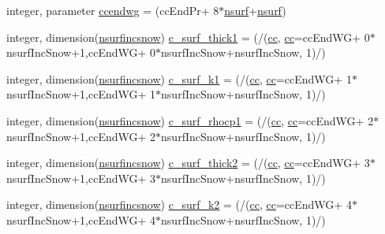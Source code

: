\begin{DoxyCompactItemize}
\item 
integer, parameter \hyperlink{namespaceallocatearray_a8a78b81f97b58eabdf3093c545cbd9f5}{ccendwg} = (cc\+End\+Pr+ 8$\ast$\hyperlink{namespaceallocatearray_acd22f92a06f7e9a2a91426b3dc99fdb0}{nsurf}+\hyperlink{namespaceallocatearray_acd22f92a06f7e9a2a91426b3dc99fdb0}{nsurf})
\item 
integer, dimension(\hyperlink{namespaceallocatearray_af4d113f332b6759cfa22271140c9162d}{nsurfincsnow}) \hyperlink{namespaceallocatearray_a866c8ff557fab63314fe0c293b2d1782}{c\+\_\+surf\+\_\+thick1} = (/(\hyperlink{namespaceallocatearray_ac863c81704eb507dee10f5e10741e10c}{cc}, \hyperlink{namespaceallocatearray_ac863c81704eb507dee10f5e10741e10c}{cc}=cc\+End\+WG+ 0$\ast$nsurf\+Inc\+Snow+1,cc\+End\+WG+ 0$\ast$nsurf\+Inc\+Snow+nsurf\+Inc\+Snow, 1)/)
\item 
integer, dimension(\hyperlink{namespaceallocatearray_af4d113f332b6759cfa22271140c9162d}{nsurfincsnow}) \hyperlink{namespaceallocatearray_a19301e431885ac6ef6524c2bf4e0829c}{c\+\_\+surf\+\_\+k1} = (/(\hyperlink{namespaceallocatearray_ac863c81704eb507dee10f5e10741e10c}{cc}, \hyperlink{namespaceallocatearray_ac863c81704eb507dee10f5e10741e10c}{cc}=cc\+End\+WG+ 1$\ast$nsurf\+Inc\+Snow+1,cc\+End\+WG+ 1$\ast$nsurf\+Inc\+Snow+nsurf\+Inc\+Snow, 1)/)
\item 
integer, dimension(\hyperlink{namespaceallocatearray_af4d113f332b6759cfa22271140c9162d}{nsurfincsnow}) \hyperlink{namespaceallocatearray_addb0a760e3ebe1883e253698960a3075}{c\+\_\+surf\+\_\+rhocp1} = (/(\hyperlink{namespaceallocatearray_ac863c81704eb507dee10f5e10741e10c}{cc}, \hyperlink{namespaceallocatearray_ac863c81704eb507dee10f5e10741e10c}{cc}=cc\+End\+WG+ 2$\ast$nsurf\+Inc\+Snow+1,cc\+End\+WG+ 2$\ast$nsurf\+Inc\+Snow+nsurf\+Inc\+Snow, 1)/)
\item 
integer, dimension(\hyperlink{namespaceallocatearray_af4d113f332b6759cfa22271140c9162d}{nsurfincsnow}) \hyperlink{namespaceallocatearray_ab0c34bdf07a4bcc153b9821464d45a3e}{c\+\_\+surf\+\_\+thick2} = (/(\hyperlink{namespaceallocatearray_ac863c81704eb507dee10f5e10741e10c}{cc}, \hyperlink{namespaceallocatearray_ac863c81704eb507dee10f5e10741e10c}{cc}=cc\+End\+WG+ 3$\ast$nsurf\+Inc\+Snow+1,cc\+End\+WG+ 3$\ast$nsurf\+Inc\+Snow+nsurf\+Inc\+Snow, 1)/)
\item 
integer, dimension(\hyperlink{namespaceallocatearray_af4d113f332b6759cfa22271140c9162d}{nsurfincsnow}) \hyperlink{namespaceallocatearray_ac896b61bac1cd4d2eea1332e3c5b18e6}{c\+\_\+surf\+\_\+k2} = (/(\hyperlink{namespaceallocatearray_ac863c81704eb507dee10f5e10741e10c}{cc}, \hyperlink{namespaceallocatearray_ac863c81704eb507dee10f5e10741e10c}{cc}=cc\+End\+WG+ 4$\ast$nsurf\+Inc\+Snow+1,cc\+End\+WG+ 4$\ast$nsurf\+Inc\+Snow+nsurf\+Inc\+Snow, 1)/)

\end{DoxyCompactItemize}

